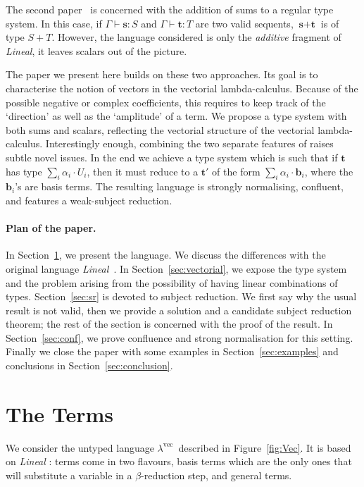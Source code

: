 \documentclass[colorlinks=true,linkcolor=black,urlcolor=black,citecolor=blue,submission,copyright,creativecommons]{eptcs}
\newcommand{\lvec}{\ensuremath{\lambda^{\!\!\textrm{vec}}}}
\newcommand{\ve}[1]{\mathrm{\textbf{#1}}}
\newcommand{\type}{\colon\!}
\begin{document}
The second paper~\cite{DiazcaroPetitWoLLIC12} is concerned with the addition of sums to a
regular type system. In this case, if $\Gamma\vdash
\ve s\type S$ and $\Gamma\vdash\ve t\type T$ are two valid sequents,
$\ve s+\ve t$ is of type $S+T$. However, the language considered is only the {\it
  additive} fragment of {\it Lineal}, it leaves scalars out of the picture.

The paper we present here builds on these two approaches. Its goal is
to characterise the notion of vectors in the vectorial
lambda-calculus. Because of the possible negative or complex
coefficients, this requires to keep track of the `direction' as well
as the `amplitude' of a term.  We propose a type system with both sums
and scalars, reflecting the vectorial structure of the vectorial
lambda-calculus. 
Interestingly enough, combining the two separate features of
\cite{ArrighiDiazcaroQPL09,DiazcaroPetitWoLLIC12} raises subtle novel
issues. In the end we achieve a type system which is such that if $\ve
t$ has type $\sum_i\alpha_i\cdot U_i$, then it must reduce to a $\ve
t'$ of the form $\sum_i\alpha_i\cdot\ve b_i$, where the $\ve b_i$'s
are basis terms.  The resulting language is strongly normalising,
confluent, and features a weak-subject reduction.


\paragraph{Plan of the paper.}
In Section~\ref{sec:language}, we present the language. We discuss the
differences with the original language {\it
  Lineal}~\cite{ArrighiDowekRTA08}. In
Section~\ref{sec:vectorial}, we expose the type system and the problem
arising from the possibility of having linear combinations of types.
Section~\ref{sec:sr} is devoted to subject reduction. We first say
why the usual result is not valid, then we provide a solution and a
candidate subject reduction theorem; the rest of the section is
concerned with the proof of the result.  In Section~\ref{sec:conf}, we prove confluence and strong normalisation for this setting.
Finally we close the paper with some examples in
Section~\ref{sec:examples} and conclusions in
Section~\ref{sec:conclusion}.


\section{The Terms}\label{sec:language}

We consider the untyped language \lvec\ described in
Figure~\ref{fig:Vec}. It is based on {\em Lineal}
\cite{ArrighiDowekRTA08}: terms come in two flavours, basis terms
which are the only ones that will substitute a variable in a
$\beta$-reduction step, and general terms. 
\end{document}
